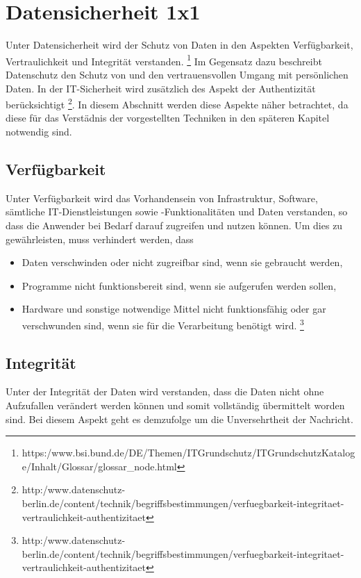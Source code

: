 \chapter{Datensicherheit 1x1}
Unter Datensicherheit wird der Schutz von Daten in den Aspekten Verfügbarkeit, Vertraulichkeit und Integrität verstanden. \footnote{https:/www.bsi.bund.de/DE/Themen/ITGrundschutz/ITGrundschutzKataloge/Inhalt/Glossar/glossar_node.html} Im Gegensatz dazu beschreibt Datenschutz den Schutz von und den vertrauensvollen Umgang mit persönlichen Daten. In der IT-Sicherheit wird zusätzlich des Aspekt der Authentizität berücksichtigt \footnote{http:/www.datenschutz-berlin.de/content/technik/begriffsbestimmungen/verfuegbarkeit-integritaet-vertraulichkeit-authentizitaet}. In diesem Abschnitt werden diese Aspekte näher betrachtet, da diese für das Verstädnis der vorgestellten Techniken in den späteren Kapitel notwendig sind.

\section{Verfügbarkeit}

Unter Verfügbarkeit wird das Vorhandensein von Infrastruktur, Software, sämtliche IT-Dienstleistungen sowie -Funktionalitäten und Daten verstanden, so dass die Anwender bei Bedarf darauf zugreifen und nutzen können. Um dies zu gewährleisten, muss verhindert werden, dass
\begin{itemize}
\item Daten verschwinden oder nicht zugreifbar sind, wenn sie gebraucht werden,
\item Programme nicht funktionsbereit sind, wenn sie aufgerufen werden sollen,
\item Hardware und sonstige notwendige Mittel nicht funktionsfähig oder gar verschwunden sind, wenn sie für die Verarbeitung benötigt wird. \footnote{http:/www.datenschutz-berlin.de/content/technik/begriffsbestimmungen/verfuegbarkeit-integritaet-vertraulichkeit-authentizitaet}
\end{itemize}

\section{Integrität}
Unter der Integrität der Daten wird verstanden, dass die Daten nicht ohne Aufzufallen verändert werden können und somit vollständig übermittelt worden sind. Bei diesem Aspekt geht es demzufolge um die Unversehrtheit der Nachricht.

